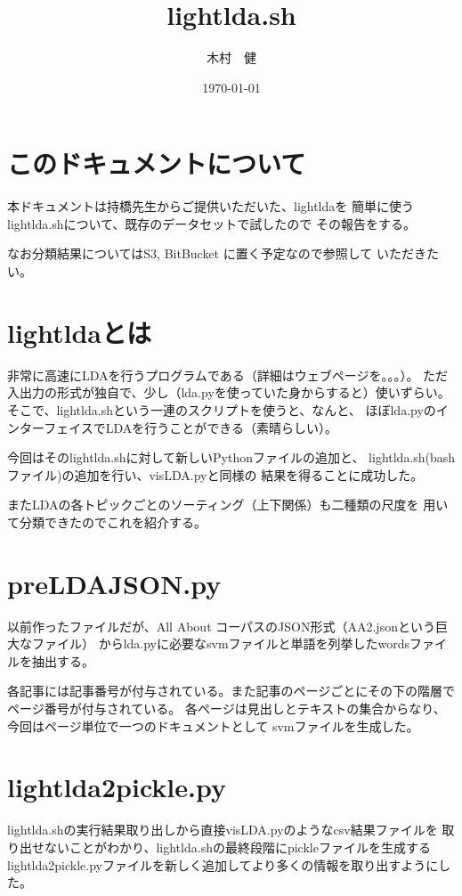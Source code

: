 \documentclass[uplatex,dvipdfmx,fleqn]{jsarticle}
\begin{document}
\title{\huge lightlda.sh}
\author{木村　健}
\date{\today}
\maketitle


\section{このドキュメントについて}
本ドキュメントは持橋先生からご提供いただいた、lightldaを
簡単に使うlightlda.shについて、既存のデータセットで試したので
その報告をする。

なお分類結果についてはS3, BitBucket に置く予定なので参照して
いただきたい。

\section{lightlda\protect\cite{lightlda}とは}
非常に高速にLDAを行うプログラムである（詳細はウェブページを。。。）。
ただ入出力の形式が独自で、少し（lda.pyを使っていた身からすると）使いずらい。
そこで、lightlda.shという一連のスクリプトを使うと、なんと、
ほぼlda.pyのインターフェイスでLDAを行うことができる（素晴らしい）。

今回はそのlightlda.shに対して新しいPythonファイルの追加と、
lightlda.sh(bashファイル)の追加を行い、visLDA.pyと同様の
結果を得ることに成功した。

またLDAの各トピックごとのソーティング（上下関係）も二種類の尺度を
用いて分類できたのでこれを紹介する。

\section{preLDAJSON.py}
以前作ったファイルだが、All About コーパスのJSON形式（AA2.jsonという巨大なファイル）
からlda.pyに必要なsvmファイルと単語を列挙したwordsファイルを抽出する。

各記事には記事番号が付与されている。また記事のページごとにその下の階層でページ番号が付与されている。
各ページは見出しとテキストの集合からなり、今回はページ単位で一つのドキュメントとして
svmファイルを生成した。

\section{lightlda2pickle.py}
lightlda.shの実行結果取り出しから直接visLDA.pyのようなcsv結果ファイルを
取り出せないことがわかり、lightlda.shの最終段階にpickleファイルを生成する
lightlda2pickle.pyファイルを新しく追加してより多くの情報を取り出すようにした。
\end{document}

